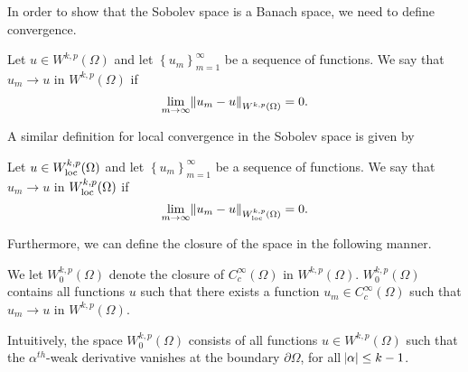 \documentclass[10pt]{article}
\begin{document}
In order to show that the Sobolev space is a Banach space, we need to define convergence. 
\begin{definition}
	Let $u \in W^{k,p}(\Omega)$ and let $\left\{ u_m \right\}_{m = 1}^{\infty}$ be a sequence of functions. We say that $u_m \to u$ in $W^{k,p}(\Omega)$ if 
	\begin{equation*}
		\displaystyle \lim\limits_{m \to \infty}{\norm{u_m - u}_{W^{k,p}(\Omega)}} = 0. 
	\end{equation*}
\end{definition}
A similar definition for local convergence in the Sobolev space is given by 
\begin{definition}
	Let $u \in W_{\operatorname{loc}}^{k,p}(\Omega)$ and let $\left\{ u_m \right\}_{m = 1}^{\infty}$ be a sequence of functions. We say that $u_m \to u$ in $W_{\operatorname{loc}}^{k,p}(\Omega)$ if 
	\begin{equation*}
		\displaystyle \lim\limits_{m \to \infty}{\norm{u_m - u}_{W_{\operatorname{loc}}^{k,p}(\Omega)}} = 0. 
	\end{equation*}
\end{definition}
Furthermore, we can define the closure of the space in the following manner.
\begin{definition}
	We let $W^{k,p}_0(\Omega)$ denote the closure of $C_c^{\infty}(\Omega)$ in $W^{k,p}(\Omega)$. $W^{k,p}_0(\Omega)$ contains all functions $u$ such that there exists a function $u_m \in C_c^{\infty}(\Omega)$ such that $u_m \to u$ in $W^{k,p}(\Omega)$. 
\end{definition}
Intuitively, the space $W_0^{k,p}(\Omega)$ consists of all functions $u \in W^{k,p}(\Omega)$ such that the $\alpha^{th}$-weak derivative vanishes at the boundary $\partial \Omega$, for all $\abs{\alpha} \leq k - 1$. 
\end{document}
